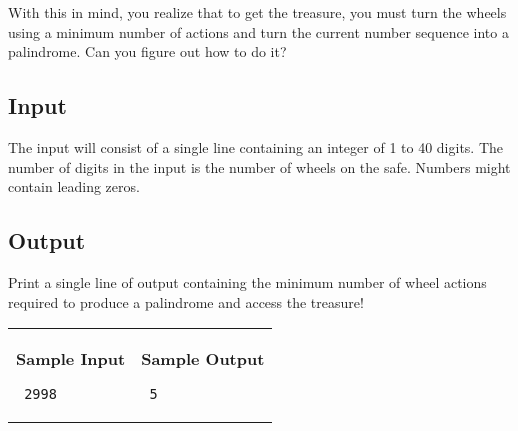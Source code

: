 \documentclass[11pt]{article}
\begin{document}
With this in mind, you realize that to get the treasure, you must turn the wheels using a minimum number of actions and turn the current number sequence into a palindrome. Can you figure out how to do it?

\subsection*{Input}

The input will consist of a single line containing an integer of 1 to 40 digits. The number of digits in the input is the number of wheels on the safe. Numbers might contain leading zeros.

\subsection*{Output}

Print a single line of output containing the minimum number of wheel actions required to produce a palindrome and access the treasure!


\vspace{0.25in}\hspace{-0.3in}\begin{tabular}{ll}

\parbox{3in}{{\large\bf Sample Input}

\vspace{0.15in}

{\tt 
2998
}
}

&

\parbox{3in}{{\large\bf Sample Output}

\vspace{0.15in}

{\tt
5
}


}

\\
\end{tabular}
\end{document}
